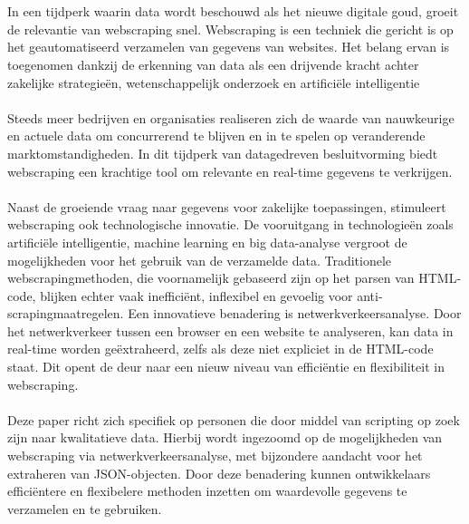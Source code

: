 
\chapter{}%
\label{ch:inleiding}
In een tijdperk waarin data wordt beschouwd als het nieuwe digitale goud, groeit de relevantie van webscraping snel. Webscraping is een techniek die gericht is op het geautomatiseerd verzamelen van gegevens van websites. Het belang ervan is toegenomen dankzij de erkenning van data als een drijvende kracht achter zakelijke strategieën, wetenschappelijk onderzoek en artificiële intelligentie~\autocite{RizaOeztuerk2023}
\\ \\
Steeds meer bedrijven en organisaties realiseren zich de waarde van nauwkeurige en actuele data om concurrerend te blijven en in te spelen op veranderende marktomstandigheden. In dit tijdperk van datagedreven besluitvorming biedt webscraping een krachtige tool om relevante en real-time gegevens te verkrijgen.
\\ \\
Naast de groeiende vraag naar gegevens voor zakelijke toepassingen, stimuleert webscraping ook technologische innovatie. De vooruitgang in technologieën zoals artificiële intelligentie, machine learning en big data-analyse vergroot de mogelijkheden voor het gebruik van de verzamelde data. Traditionele webscrapingmethoden, die voornamelijk gebaseerd zijn op het parsen van HTML-code, blijken echter vaak inefficiënt, inflexibel en gevoelig voor anti-scrapingmaatregelen. Een innovatieve benadering is netwerkverkeersanalyse. Door het netwerkverkeer tussen een browser en een website te analyseren, kan data in real-time worden geëxtraheerd, zelfs als deze niet expliciet in de HTML-code staat. Dit opent de deur naar een nieuw niveau van efficiëntie en flexibiliteit in webscraping.
\\ \\
Deze paper richt zich specifiek op personen die door middel van scripting op zoek zijn naar kwalitatieve data. Hierbij wordt ingezoomd op de mogelijkheden van webscraping via netwerkverkeersanalyse, met bijzondere aandacht voor het extraheren van JSON-objecten. Door deze benadering kunnen ontwikkelaars efficiëntere en flexibelere methoden inzetten om waardevolle gegevens te verzamelen en te gebruiken.
